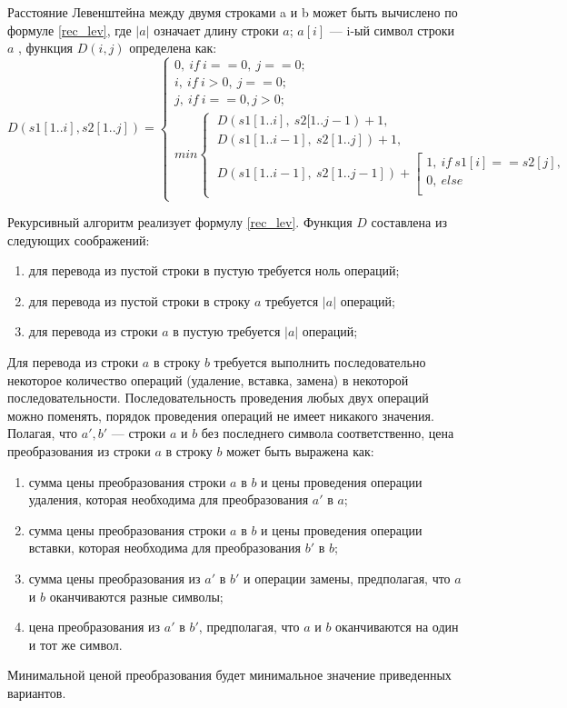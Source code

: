 Расстояние Левенштейна между двумя строками a и b может быть вычислено по формуле \ref{rec_lev}, где $|a|$ означает длину строки $a$; $a[i]$ — i-ый символ строки $a$ , функция $D(i, j)$ определена как:
\begin{equation}
	\label{rec_lev}
	D(s1[1..i], s2[1..j]) = 
	\begin{cases}
		0,~if~i == 0,~j == 0; \\
		i,~if~i > 0,~j == 0; \\
		j,~if~i == 0, j > 0; \\
		min
		\begin{cases}
			~D(s1[1..i],~s2[1..j-1) + 1, \\
			~D(s1[1..i-1],~s2[1..j]) + 1, \\
			~D(s1[1..i-1],~s2[1..j-1]) + 
			\left[
			\begin{gathered}
				1,~if~s1[i] == s2[j], \\
				0,~else \\
			\end{gathered}
			\right.
		\end{cases}
	\end{cases}	
\end{equation}


Рекурсивный алгоритм реализует формулу \ref{rec_lev}.
Функция $D$ составлена из следующих соображений:
\begin{enumerate}[label={\arabic*)}]
	\item для перевода из пустой строки в пустую требуется ноль операций;
	\item для перевода из пустой строки в строку $a$ требуется $|a|$ операций;
	\item для перевода из строки $a$ в пустую требуется $|a|$ операций;
\end{enumerate}
Для перевода из строки $a$ в строку $b$ требуется выполнить последовательно некоторое количество операций (удаление, вставка, замена) в некоторой последовательности. Последовательность проведения любых двух операций можно поменять, порядок проведения операций не имеет никакого значения. Полагая, что $a', b'$  — строки $a$ и $b$ без последнего символа соответственно, цена преобразования из строки $a$ в строку $b$ может быть выражена как:
	\begin{enumerate}[label={\arabic*)}]
		\item сумма цены преобразования строки $a$ в $b$ и цены проведения операции удаления, которая необходима для преобразования $a'$ в $a$;
		\item сумма цены преобразования строки $a$ в $b$  и цены проведения операции вставки, которая необходима для преобразования $b'$ в $b$;
		\item сумма цены преобразования из $a'$ в $b'$ и операции замены, предполагая, что $a$ и $b$ оканчиваются разные символы;
		\item цена преобразования из $a'$ в $b'$, предполагая, что $a$ и $b$ оканчиваются на один и тот же символ.
	\end{enumerate}
Минимальной ценой преобразования будет минимальное значение приведенных вариантов.


